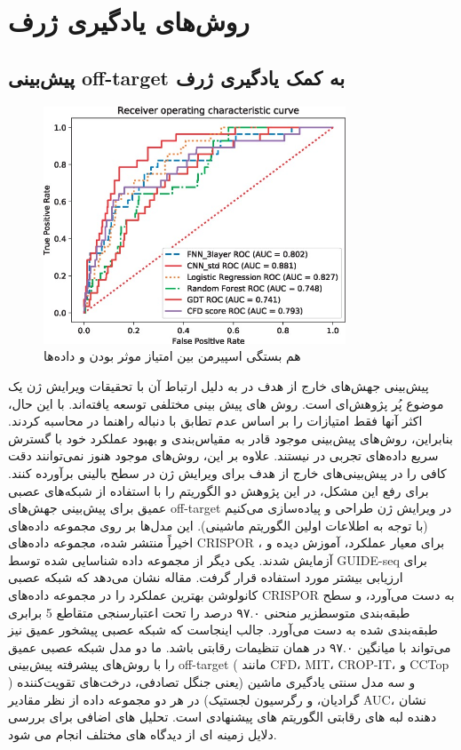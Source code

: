 \documentclass[12pt,a4paper,BCOR=.7cm,headsepline,bibliography=totoc]{report}
\begin{document}
\section{روش‌های یادگیری ژرف}
\subsection{پیش‌بینی off-target به کمک یادگیری ژرف}
\begin{figure}
\centering
\includegraphics[width=9cm, ]{pictures/DeepLearning.jpg}
\caption{
هم بستگی اسپیرمن بین امتیاز موثر بودن و داده‌ها ~\cite{chart}
}\label{wrap-fig:4}
\end{figure}
پیش‌بینی جهش‌های خارج از هدف در  به دلیل ارتباط آن با تحقیقات ویرایش ژن یک موضوع پُر پژوهش‌ای است. روش های پیش بینی مختلفی توسعه یافته‌اند. با این حال، اکثر آنها فقط امتیازات را بر اساس عدم تطابق با دنباله راهنما در  محاسبه کردند. بنابراین، روش‌های پیش‌بینی موجود قادر به مقیاس‌بندی و بهبود عملکرد خود با گسترش سریع داده‌های تجربی در  نیستند. علاوه بر این، روش‌های موجود هنوز نمی‌توانند دقت کافی را در پیش‌بینی‌های خارج از هدف برای ویرایش ژن در سطح بالینی برآورده کنند. برای رفع این مشکل، در این پژوهش دو الگوریتم را با استفاده از شبکه‌های عصبی عمیق برای پیش‌بینی جهش‌های off-target در ویرایش ژن  طراحی و پیاده‌سازی می‌کنیم (با توجه به اطلاعات اولین الگوریتم ماشینی). این مدل‌ها بر روی مجموعه داده‌های اخیراً منتشر شده، مجموعه داده‌های CRISPOR ، برای معیار عملکرد، آموزش دیده و آزمایش شدند. یکی دیگر از مجموعه داده شناسایی شده توسط GUIDE-seq برای ارزیابی بیشتر مورد استفاده قرار گرفت. مقاله نشان می‌دهد که شبکه عصبی کانولوشن بهترین عملکرد را در مجموعه داده‌های CRISPOR به دست می‌آورد، و سطح طبقه‌بندی متوسط ​​زیر منحنی ۹۷.۰ درصد را تحت اعتبارسنجی متقاطع 5 برابری طبقه‌بندی شده به دست می‌آورد. جالب اینجاست که شبکه عصبی پیشخور عمیق نیز می‌تواند با میانگین ۹۷.۰ در همان تنظیمات رقابتی باشد. ما دو مدل شبکه عصبی عمیق را با روش‌های پیشرفته پیش‌بینی off-target ( مانند CFD، MIT، CROP-IT، و CCTop ) و سه مدل سنتی یادگیری ماشین (یعنی جنگل تصادفی، درخت‌های تقویت‌کننده گرادیان، و رگرسیون لجستیک) در هر دو مجموعه داده از نظر مقادیر AUC، نشان دهنده لبه های رقابتی الگوریتم های پیشنهادی است. تحلیل های اضافی برای بررسی دلایل زمینه ای از دیدگاه های مختلف انجام می شود.
\end{document}

